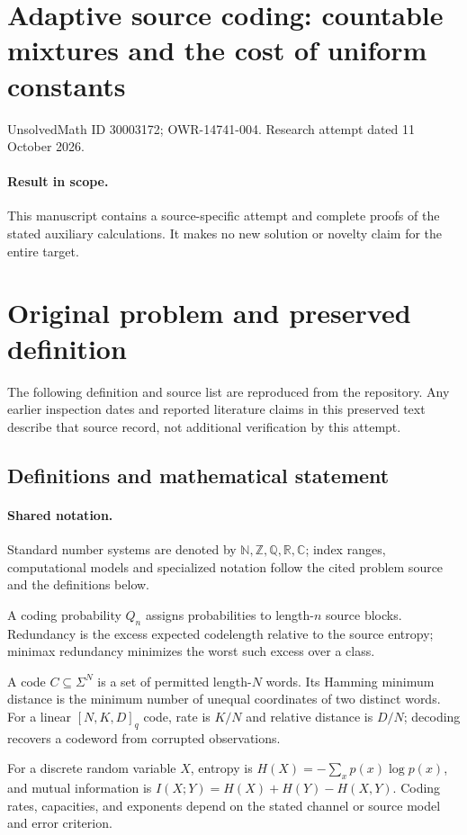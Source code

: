 \documentclass[11pt]{article}
\begin{document}
\section*{Adaptive source coding: countable mixtures and the cost of uniform constants}
\noindent UnsolvedMath ID 30003172; OWR-14741-004. Research attempt dated 11 October 2026.
\paragraph{Result in scope.}This manuscript contains a source-specific attempt and complete proofs of the stated auxiliary calculations. It makes no new solution or novelty claim for the entire target.
\section{Original problem and preserved definition}
The following definition and source list are reproduced from the repository. Any earlier inspection dates and reported literature claims in this preserved text describe that source record, not additional verification by this attempt.
\subsection{Definitions and mathematical statement}

\paragraph{Shared notation.}Standard number systems are denoted by $\mathbb N,\mathbb Z,\mathbb Q,\mathbb R,\mathbb C$; index ranges, computational models and specialized notation follow the cited problem source and the definitions below.


A coding probability $Q_n$ assigns probabilities to length-$n$ source blocks. Redundancy is the excess expected codelength relative to the source entropy; minimax redundancy minimizes the worst such excess over a class.

A code $C\subseteq\Sigma^N$ is a set of permitted length-$N$ words. Its Hamming minimum distance is the minimum number of unequal coordinates of two distinct words. For a linear $[N,K,D]_q$ code, rate is $K/N$ and relative distance is $D/N$; decoding recovers a codeword from corrupted observations.

For a discrete random variable $X$, entropy is $H(X)=-\sum_xp(x)\log p(x)$, and mutual information is $I(X;Y)=H(X)+H(Y)-H(X,Y)$. Coding rates, capacities, and exponents depend on the stated channel or source model and error criterion.
\end{document}
